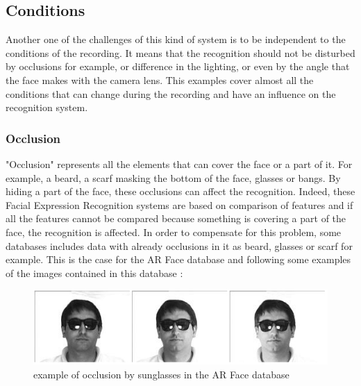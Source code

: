\subsection{Conditions}

\vspace{\baselineskip}
\noindent Another one of the challenges of this kind of system is to be independent to the conditions of the recording. It means that the recognition should not be disturbed by occlusions for example, or difference in the lighting, or even by the angle that the face makes with the camera lens. This examples cover almost all the conditions that can change during the recording and have an influence on the recognition system. 
\newline

\subsubsection{Occlusion}

\vspace{\baselineskip}
\noindent "Occlusion" represents all the elements that can cover the face or a part of it. For example, a beard, a scarf masking the bottom of the face, glasses or bangs. By hiding a part of the face, these occlusions can affect the recognition. Indeed, these Facial Expression Recognition systems are based on comparison of features and if all the features cannot be compared because something is covering a part of the face, the recognition is affected. In order to compensate for this problem, some databases includes data with already occlusions in it as beard, glasses or scarf for example. This is the case for the AR Face database and following some examples of the images contained in this database \cite{ARFACE}:
\newline

\begin{figure}[!h]
\begin{center}
\noindent \includegraphics[scale=0.7]{figures/arface_example2} 
\newline
\caption{example of occlusion by sunglasses in the AR Face database}
\label{arface_example2}
\end{center} 
\end{figure}

